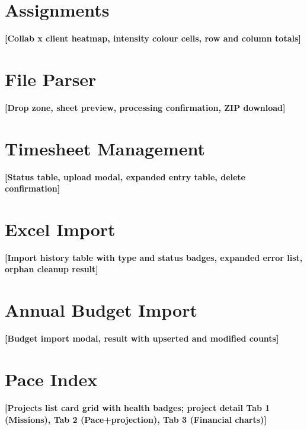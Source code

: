 \documentclass[12pt,a4paper]{report}
\begin{document}
\section*{Assignments}\label{annex:Assignments}
\begin{placeholder}\textbf{[Collab x client heatmap, intensity colour cells, row and column totals]}\end{placeholder}

\section*{File Parser}\label{annex:File Parser}
\begin{placeholder}\textbf{[Drop zone, sheet preview, processing confirmation, ZIP download]}\end{placeholder}

\section*{Timesheet Management}\label{annex:Timesheet Management}
\begin{placeholder}\textbf{[Status table, upload modal, expanded entry table, delete confirmation]}\end{placeholder}

\section*{Excel Import}\label{annex:Excel Import}
\begin{placeholder}\textbf{[Import history table with type and status badges, expanded error list, orphan cleanup result]}\end{placeholder}

\section*{Annual Budget Import}\label{annex:Annual Budget Import}
\begin{placeholder}\textbf{[Budget import modal, result with upserted and modified counts]}\end{placeholder}

\section*{Pace Index}\label{annex:Pace Index}
\begin{placeholder}\textbf{[Projects list card grid with health badges; project detail Tab 1 (Missions), Tab 2 (Pace+projection), Tab 3 (Financial charts)]}\end{placeholder}
\end{document}
